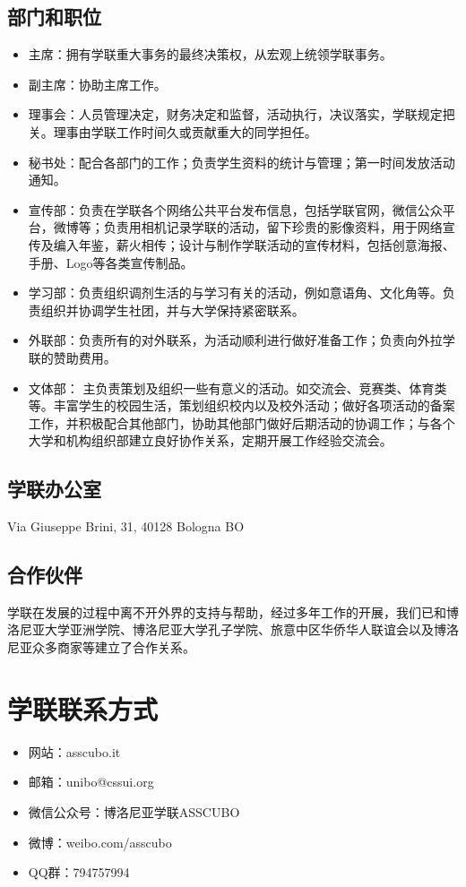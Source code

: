 \subsection{部门和职位}
\begin{itemize}
\item 主席：拥有学联重大事务的最终决策权，从宏观上统领学联事务。
\item 副主席：协助主席工作。 
\item 理事会：人员管理决定，财务决定和监督，活动执行，决议落实，学联规定把关。理事由学联工作时间久或贡献重大的同学担任。
\item 秘书处：配合各部门的工作；负责学生资料的统计与管理；第一时间发放活动通知。
\item 宣传部：负责在学联各个网络公共平台发布信息，包括学联官网，微信公众平台，微博等；负责用相机记录学联的活动，留下珍贵的影像资料，用于网络宣传及编入年鉴，薪火相传；设计与制作学联活动的宣传材料，包括创意海报、手册、Logo等各类宣传制品。
\item 学习部：负责组织调剂生活的与学习有关的活动，例如意语角、文化角等。负责组织并协调学生社团，并与大学保持紧密联系。
\item 外联部：负责所有的对外联系，为活动顺利进行做好准备工作；负责向外拉学联的赞助费用。
\item 文体部： 主负责策划及组织一些有意义的活动。如交流会、竞赛类、体育类等。丰富学生的校园生活，策划组织校内以及校外活动；做好各项活动的备案工作，并积极配合其他部门，协助其他部门做好后期活动的协调工作；与各个大学和机构组织部建立良好协作关系，定期开展工作经验交流会。
\end{itemize}


\subsection{学联办公室}
Via Giuseppe Brini, 31, 40128 Bologna BO


\subsection{合作伙伴}
学联在发展的过程中离不开外界的支持与帮助，经过多年工作的开展，我们已和博洛尼亚大学亚洲学院、博洛尼亚大学孔子学院、旅意中区华侨华人联谊会以及博洛尼亚众多商家等建立了合作关系。

\section{学联联系方式}
\begin{itemize}
\item 网站：asscubo.it 
\item 邮箱：unibo@cssui.org
\item 微信公众号：博洛尼亚学联ASSCUBO
\item 微博：weibo.com/asscubo
\item QQ群：794757994
\end{itemize}

